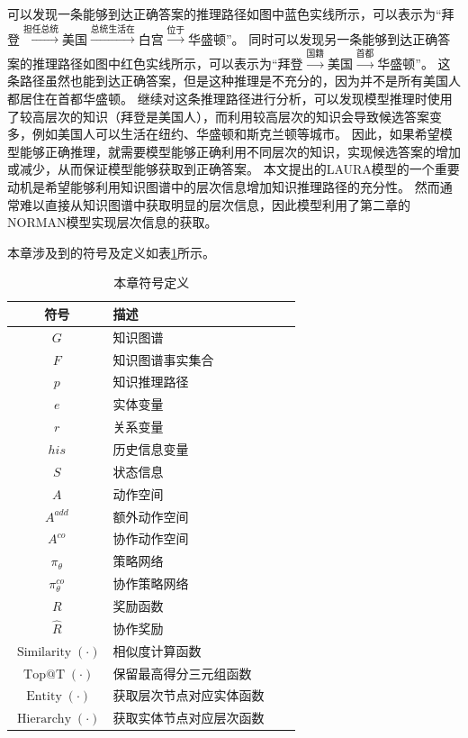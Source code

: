\documentclass[algorithmlist, AutoFakeBold, AutoFakeSlant, figurelist, tablelist, nomlist, engineering]{seuthesix}
\begin{document}
可以发现一条能够到达正确答案的推理路径如图中蓝色实线所示，可以表示为“拜登$\xrightarrow{\mbox{担任总统}}$美国$\xrightarrow{\mbox{总统生活在}}$白宫$\xrightarrow{\mbox{位于}}$华盛顿”。
同时可以发现另一条能够到达正确答案的推理路径如图中红色实线所示，可以表示为“拜登$\xrightarrow{\mbox{国籍}}$美国$\xrightarrow{\mbox{首都}}$华盛顿”。
这条路径虽然也能到达正确答案，但是这种推理是不充分的，因为并不是所有美国人都居住在首都华盛顿。
继续对这条推理路径进行分析，可以发现模型推理时使用了较高层次的知识（拜登是美国人），而利用较高层次的知识会导致候选答案变多，例如美国人可以生活在纽约、华盛顿和斯克兰顿等城市。
因此，如果希望模型能够正确推理，就需要模型能够正确利用不同层次的知识，实现候选答案的增加或减少，从而保证模型能够获取到正确答案。
本文提出的LAURA模型的一个重要动机是希望能够利用知识图谱中的层次信息增加知识推理路径的充分性。
然而通常难以直接从知识图谱中获取明显的层次信息，因此模型利用了第二章的NORMAN模型实现层次信息的获取。

本章涉及到的符号及定义如表\ref{3_symbols}所示。
\begin{table}[ht]
  \centering
  \begin{tabular*}{0.6\textwidth}{@{\extracolsep{\fill}}clcl}
		\toprule[1pt]
    符号 & 描述\\ \hline
    $G$ & 知识图谱\\
    $F$ & 知识图谱事实集合\\
    $p$ & 知识推理路径\\
    $e$ & 实体变量\\
    $r$ & 关系变量\\
    $his$ & 历史信息变量\\
    $S$ & 状态信息\\
    $A$ & 动作空间\\
    $A^{add}$ & 额外动作空间\\
    $A^{co}$ & 协作动作空间\\
    $\pi_\theta$ & 策略网络\\
    $\pi_\theta^{co}$ & 协作策略网络\\
    $R$ & 奖励函数\\
    $\hat{R}$ & 协作奖励\\
    $\operatorname{Similarity}(\cdot)$ & 相似度计算函数\\
    $\operatorname{Top@T}(\cdot)$ & 保留最高得分三元组函数\\
    $\operatorname{Entity}(\cdot)$ & 获取层次节点对应实体函数\\
    $\operatorname{Hierarchy}(\cdot)$ & 获取实体节点对应层次函数\\
		\bottomrule[1pt]
	\end{tabular*}
  \caption{本章符号定义}
  \label{3_symbols}
\end{table}
\end{document}
